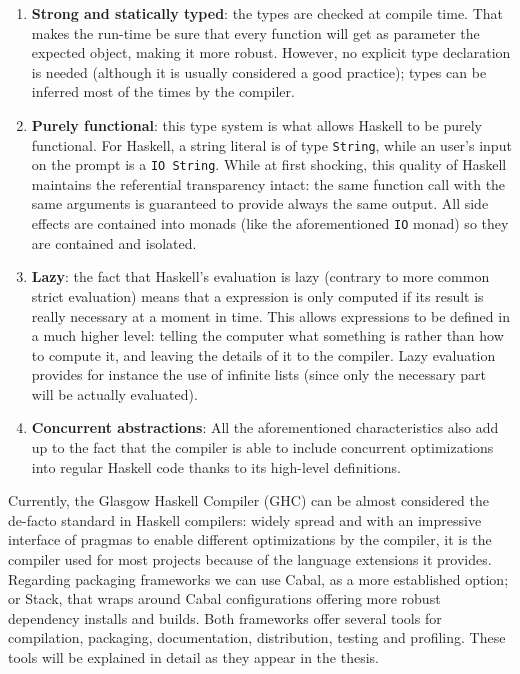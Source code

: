 \begin{enumerate}
\item \textbf{Strong and statically typed}: the types are checked at compile
  time. That makes the run-time be sure that every function will get as
  parameter the expected object, making it more robust. However, no explicit
  type declaration is needed (although it is usually considered a good
  practice); types can be inferred most of the times by the compiler.
\item \textbf{Purely functional}: this type system is what allows Haskell to be
  purely functional. For Haskell, a string literal is of type \texttt{String},
  while an user's input on the prompt is a \texttt{IO String}. While at first
  shocking, this quality of Haskell maintains the referential transparency
  intact: the same function call with the same arguments is guaranteed to
  provide always the same output. All side effects are contained into monads
  (like the aforementioned \texttt{IO} monad) so they are contained and
  isolated.
\item \textbf{Lazy}: the fact that Haskell's evaluation is lazy (contrary to
  more common strict evaluation) means that a expression is only computed if
  its result is really necessary at a moment in time. This allows expressions
  to be defined in a much higher level: telling the computer what something is
  rather than how to compute it, and leaving the details of it to the compiler.
  Lazy evaluation provides for instance the use of infinite lists (since only
  the necessary part will be actually evaluated).
\item \textbf{Concurrent abstractions}: All the aforementioned characteristics
  also add up to the fact that the compiler is able to include concurrent
  optimizations into regular Haskell code thanks to its high-level definitions.
\end{enumerate}

Currently, the Glasgow Haskell Compiler (GHC) can be almost considered the
de-facto standard in Haskell compilers: widely spread and with an impressive
interface of pragmas to enable different optimizations by the compiler, it is
the compiler used for most projects because of the language extensions it
provides. Regarding packaging frameworks we can use Cabal, as a more
established option; or Stack, that wraps around Cabal configurations offering
more robust dependency installs and builds. Both frameworks offer several tools
for compilation, packaging, documentation, distribution, testing and profiling.
These tools will be explained in detail as they appear in the thesis.\\

